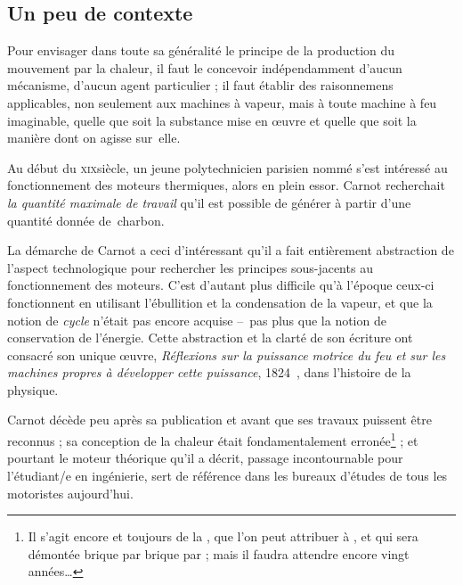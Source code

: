	\subsection{Un peu de contexte}
	\label{ch_contexte_cycle_carnot}

			Pour envisager dans toute sa généralité le principe de la production du mouvement par la chaleur, il faut le concevoir indépendamment d’aucun mécanisme, d’aucun agent particulier ; il faut établir des raisonnemens applicables, non seulement aux machines à vapeur, mais à toute machine à feu imaginable, quelle que soit la substance mise en œuvre et quelle que soit la manière dont on agisse sur~elle.

		Au début du \textsc{xix}\ieme siècle, un jeune polytechnicien parisien nommé  s’est intéressé au fonctionnement des moteurs thermiques, alors en plein essor. Carnot recherchait \emph{la quantité maximale de travail} qu’il est possible de générer à partir d’une quantité donnée de~charbon.

		La démarche de Carnot a ceci d’intéressant qu’il a fait entièrement abstraction de l’aspect technologique pour rechercher les principes sous-jacents au fonctionnement des moteurs. C’est d’autant plus difficile qu’à l’époque ceux-ci fonctionnent en utilisant l’ébullition et la condensation de la vapeur, et que la notion de \emph{cycle} n’était pas encore acquise --\ pas plus que la notion de conservation de l’énergie. Cette abstraction et la clarté de son écriture ont consacré son unique œuvre, \textit{Réflexions sur la puissance motrice du feu et sur les machines propres à développer cette puissance}, 1824~\cite{carnot1824}, dans l’histoire de la physique.

		 Carnot décède peu après sa publication et avant que ses travaux puissent être reconnus ; sa conception de la chaleur était fondamentalement erronée\footnote{Il s’agit encore et toujours de la , que l’on peut attribuer à , et qui sera démontée brique par brique par  ; mais il faudra attendre encore vingt années…}%
		 ; et pourtant le moteur théorique qu’il a décrit, passage incontournable pour l’étudiant/e en ingénierie, sert de référence dans les bureaux d’études de tous les motoristes aujourd’hui.


